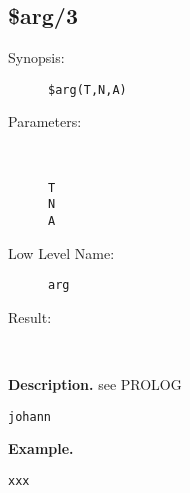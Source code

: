 %
%
%
\subsection{\$arg/3}

\begin{description}
\item[Synopsis:]
	{\tt \$arg(T,N,A)}
\item[Parameters:]\ \\[-0.5cm]
	\begin{description}
	\item[{\tt T}]
	\item[{\tt N}]
	\item[{\tt A}]
	\end{description}
\item[Low Level Name:]
	{\tt arg}
\item[Result:]\ \\
\end{description}

\vspace*{0.5cm}
\noindent
{\bf Description.}
see PROLOG

{\tt johann}

\vspace*{0.5cm}
\noindent
{\bf Example.}
\begin{verbatim}
xxx
\end{verbatim}


